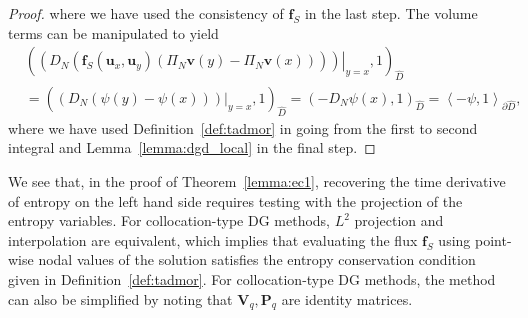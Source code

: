 \documentclass[preprint,10pt]{article}
\theoremstyle{definition}
\theoremstyle{lemma}
\theoremstyle{theorem}
\theoremstyle{assumption}
\newcommand{\LRp}[1]{\left( #1 \right)}
\newcommand{\LRa}[1]{\left\langle #1 \right\rangle}
\begin{document}
\begin{proof}
where we have used the consistency of $\bm{f}_S$ in the last step.  
The volume terms can be manipulated to yield
\begin{align*}
&\LRp{\left.\LRp{D_N \LRp{\bm{f}_S(\bm{u}_x,\bm{u}_y)\LRp{\Pi_N\bm{v}(y)-\Pi_N\bm{v}(x)} }}\right|_{y=x},1}_{\widehat{D}} \\
&= \LRp{ \left.\LRp{D_N\LRp{\psi(y)-\psi(x) }}\right|_{y=x},1}_{\widehat{D}} = \LRp{-D_N \psi(x),1}_{\widehat{D}} = \LRa{-\psi,1}_{\partial \widehat{D}},
\end{align*}
where we have used Definition~\ref{def:tadmor} in going from the first to second integral and Lemma~\ref{lemma:dgd_local} in the final step.  
%
\end{proof}

We see that, in the proof of Theorem~\ref{lemma:ec1}, recovering the time derivative of entropy on the left hand side requires testing with the projection of the entropy variables.  For collocation-type DG methods, $L^2$ projection and interpolation are equivalent, which implies that evaluating the flux $\bm{f}_S$ using point-wise nodal values of the solution satisfies the entropy conservation condition given in Definition~\ref{def:tadmor}.  For collocation-type DG methods, the method can also be simplified by noting that $\bm{V}_q,\bm{P}_q$ are identity matrices.  
\end{document}

